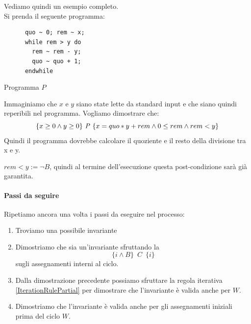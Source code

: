 				      				\begin{esempio}
				      					Vediamo quindi un esempio completo.\\
				      					Si prenda il seguente programma:
				      					\begin{listing}[H]
				      						\begin{lstlisting}
      quo ~ 0; rem ~ x;
      while rem > y do
        rem ~ rem - y;
        quo ~ quo + 1;
      endwhile  
				      						\end{lstlisting}
				      						\caption{Programma $P$}
				      						\label{E:W}
				      					\end{listing}
				      					Immaginiamo che $x$ e $y$ siano state lette da standard input e che siano quindi reperibili nel programma. Vogliamo dimostrare che:
				      					\[\{x\geq 0 \land y\geq 0\}\mbox{ \textit{P} }\{x=quo*y + rem \land 0 \leq rem \land rem < y\}\]
				      					Quindi il programma dovrebbe calcolare il quoziente e il resto della divisione tra x e y. \\ 
				      					\begin{nota}
				      					$ rem < y := \neg B $, quindi al termine dell'esecuzione questa post-condizione sarà già garantita.
				      					\end{nota}
				      					\paragraph{Passi da seguire}
				      					Ripetiamo ancora una volta i passi da eseguire nel processo:
				      			\begin{enumerate}
				      			    \item Troviamo una possibile invariante
				      			   \item Dimostriamo che sia un'invariante sfruttando la \[\{i\land B\}\,\,\, C\,\,\,\{i\}\]
				      			   sugli assegnamenti interni al ciclo.
				      			   \item Dalla dimostrazione precedente possiamo sfruttare la regola iterativa \ref{IterationRulePartial} per dimostrare che l'invariante è valida anche per $W$.
				      			   \item Dimostriamo che l'invariante è valida anche per gli assegnamenti iniziali prima del ciclo $W$.
				      			\end{enumerate}

\end{esempio}
